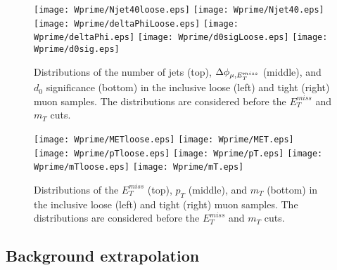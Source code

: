 



\begin{figure}[]
  \centering
  \texttt{[image: Wprime/Njet40loose.eps]}
  \texttt{[image: Wprime/Njet40.eps]}
  \texttt{[image: Wprime/deltaPhiLoose.eps]}
  \texttt{[image: Wprime/deltaPhi.eps]}
  \texttt{[image: Wprime/d0sigLoose.eps]}
  \texttt{[image: Wprime/d0sig.eps]}
  \caption{
  Distributions of the number of jets (top), $\Delta\phi_{\mu,E_T^{miss}}$ (middle), 
  and $d_0$ significance (bottom) in the inclusive loose (left) and tight (right) muon samples. 
  The distributions are considered before the $E_T^{miss}$ and $m_T$ cuts.
}
  \label{fig:muMMval1}
\end{figure}
\begin{figure}[]
  \centering
  \texttt{[image: Wprime/METloose.eps]}
  \texttt{[image: Wprime/MET.eps]}
  \texttt{[image: Wprime/pTloose.eps]}
  \texttt{[image: Wprime/pT.eps]}
  \texttt{[image: Wprime/mTloose.eps]}
  \texttt{[image: Wprime/mT.eps]}
  \caption{
  Distributions of the $E_T^{miss}$ (top), $p_T$ (middle), and $m_T$ (bottom)
  in the inclusive loose (left) and tight (right) muon samples. 
  The distributions are considered before the $E_T^{miss}$ and $m_T$ cuts.
}
  \label{fig:muMMval2}
\end{figure}


\subsection{Background extrapolation}

